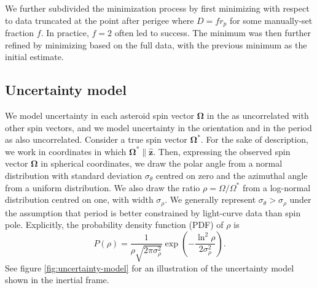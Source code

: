 \documentclass[fleqn,usenatbib]{mnras}
\newcommand{\unit}[1]{\bm{\hat{#1}}}
\newcommand{\parens}[1]{\left( #1 \right)}
\begin{document}
We further subdivided the minimization process by first minimizing with respect to data truncated at the point after perigee where $D=fr_p$ for some manually-set fraction $f$. In practice, $f=2$ often led to success. The minimum was then further refined by minimizing based on the full data, with the previous minimum as the initial estimate.




\subsection{Uncertainty model}
\label{sec:uncertainty}

We model uncertainty in each asteroid spin vector $\bm \Omega$ in the as uncorrelated with other spin vectors, and we model uncertainty in the orientation and in the period as also uncorrelated. Consider a true spin vector $\bm \Omega^*$. For the sake of description, we work in coordinates in which $\bm \Omega^* \parallel \unit z$. Then, expressing the observed spin vector $\bm \Omega$ in spherical coordinates, we draw the polar angle from a normal distribution with standard deviation $\sigma_\theta$ centred on zero and the azimuthal angle from a uniform distribution. We also draw the ratio $\rho=\Omega/\Omega^*$ from a log-normal distribution centred on one, with width $\sigma_\rho$. We generally represent $\sigma_\theta > \sigma_\rho$ under the assumption that period is better constrained by light-curve data than spin pole. Explicitly, the probability density function (PDF) of $\rho$ is 
\begin{equation}
  P(\rho) = \frac{1}{\rho\sqrt{2\pi \sigma_\rho^2}} \exp\parens{-\frac{\ln^2\rho}{2\sigma_\rho^2}}.
\end{equation}
See figure \ref{fig:uncertainty-model} for an illustration of the uncertainty model shown in the inertial frame.
\end{document}
